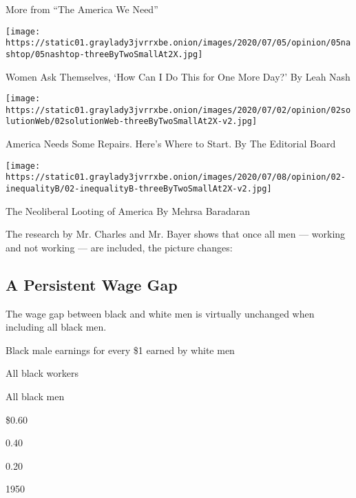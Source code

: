  More from ``The America We Need''
\href{https://www.nytimes3xbfgragh.onion/2020/07/04/opinion/sunday/women-work-coronavirus.html?action=click\&pgtype=Article\&state=default\&region=MAIN_CONTENT_2\&context=storylines_related_links}{}

\texttt{[image: https://static01.graylady3jvrrxbe.onion/images/2020/07/05/opinion/05nashtop/05nashtop-threeByTwoSmallAt2X.jpg]}

 Women Ask Themselves, `How Can I Do This for One More Day?' By Leah
Nash

\href{https://www.nytimes3xbfgragh.onion/2020/07/02/opinion/sunday/income-inequality-solutions.html?action=click\&pgtype=Article\&state=default\&region=MAIN_CONTENT_2\&context=storylines_related_links}{}

\texttt{[image: https://static01.graylady3jvrrxbe.onion/images/2020/07/02/opinion/02solutionWeb/02solutionWeb-threeByTwoSmallAt2X-v2.jpg]}

 America Needs Some Repairs. Here's Where to Start. By The Editorial
Board

\href{https://www.nytimes3xbfgragh.onion/2020/07/02/opinion/private-equity-inequality.html?action=click\&pgtype=Article\&state=default\&region=MAIN_CONTENT_2\&context=storylines_related_links}{}

\texttt{[image: https://static01.graylady3jvrrxbe.onion/images/2020/07/08/opinion/02-inequalityB/02-inequalityB-threeByTwoSmallAt2X-v2.jpg]}

 The Neoliberal Looting of America By Mehrsa Baradaran

The research by Mr. Charles and Mr. Bayer shows that once all men ---
working and not working --- are included, the picture changes:

\hypertarget{a-persistent-wage-gap}{%
\subsection{A Persistent Wage Gap}\label{a-persistent-wage-gap}}

The wage gap between black and white men is virtually unchanged when
including all black men.

Black male earnings for every \$1 earned by white men

All black workers

All black men

\$0.60

0.40

0.20

1950

